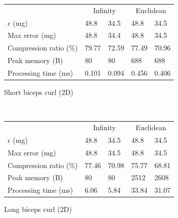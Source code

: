 \documentclass{report}
\begin{document}
\begin{table}
    \begin{subfigure}{\columnwidth}
    \centering
    \begin{tabular}{l|l|l|l|l}
    \hline
    \rowcolor{headcolor}
                           & \multicolumn{2}{c|}{Infinity} & \multicolumn{2}{c}{Euclidean}\\
    \rowcolor{headcolor}
    $\epsilon$  (mg)          & 48.8         & 34.5       & 48.8       & 34.5 \\
    \hline
    Max error   (mg)          & 48.8         & 34.4       & 48.8       & 34.5 \\
    Compression ratio (\%)    & 79.77        & 72.59      & 77.49      & 70.96\\
    Peak memory   (B)         & 80           & 80         & 688        & 688  \\
    Processing time (ms)      & 0.101        & 0.094      & 0.456      & 0.406\\ \hline
    \end{tabular}
    \caption{Short biceps curl (2D)}
    \end{subfigure}\\
    \begin{subfigure}{\columnwidth}
    \centering
    \begin{tabular}{l|l|l|l|l}
    \hline
    \rowcolor{headcolor}
                   & \multicolumn{2}{c|}{Infinity} & \multicolumn{2}{c}{Euclidean} \\
    \rowcolor{headcolor}
    $\epsilon$ (mg)            & 48.8        & 34.5       & 48.8        & 34.5    \\
    \hline
    Max error  (mg)            & 48.8        & 34.5       & 48.8        & 34.5             \\
    Compression ratio (\%)     & 77.46       & 70.98      & 75.77       & 68.81           \\
    Peak memory  (B)           & 80          & 80         & 2512        & 2608             \\
    Processing time (ms)       & 6.06        & 5.84       & 33.84       & 31.07           \\ \hline
    \end{tabular}
    \caption{Long biceps curl (2D)}
    \end{subfigure}\\
    \begin{subfigure}{\columnwidth}
    \centering
    \begin{tabular}{l|l|l|l|l}

\end{tabular}
\end{subfigure}
\end{table}
\end{document}
